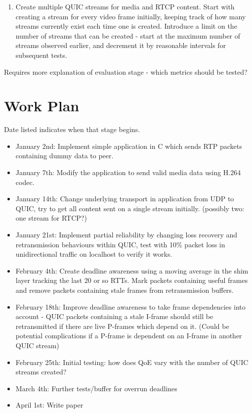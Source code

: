 \documentclass{mprop}
\begin{document}
\begin{enumerate}
  \item Create multiple QUIC streams for media and RTCP content. Start with creating a stream for 
  every video frame initially, keeping track of how many streams currently exist each time one is 
  created. Introduce a limit on the number of streams that can be created - start at the maximum 
  number of streams observed earlier, and decrement it by reasonable intervals for subsequent 
  tests.
\end{enumerate}

Requires more explanation of evaluation stage - which metrics should be tested?

\newpage

\section{Work Plan}


Date listed indicates when that stage begins.

\begin{itemize}
  \item January 2nd: Implement simple application in C which sends RTP packets containing dummy 
  data to peer.
  \item January 7th: Modify the application to send valid media data using H.264 codec.
  \item January 14th: Change underlying transport in application from UDP to QUIC, try to get all 
  content sent on a single stream initially. (possibly two: one stream for RTCP?)
  \item January 21st: Implement partial reliability by changing loss recovery and retransmission 
  behaviours within QUIC, test with 10\% packet loss in unidirectional traffic on localhost to 
  verify it works.
  \item February 4th: Create deadline awareness using a moving average in the shim layer tracking 
  the last 20 or so RTTs. Mark packets containing useful frames and remove packets containing 
  stale frames from retransmission buffers.
  \item February 18th: Improve deadline awareness to take frame dependencies into account - QUIC 
  packets containing a stale I-frame should still be retransmitted if there are live P-frames 
  which depend on it. (Could be potential complications if a P-frame is dependent on an I-frame 
  in another QUIC stream)
  \item February 25th: Initial testing: how does QoE vary with the number of QUIC streams created?
  \item March 4th: Further tests/buffer for overrun deadlines
  \item April 1st: Write paper
\end{itemize}

\newpage



\end{document}
